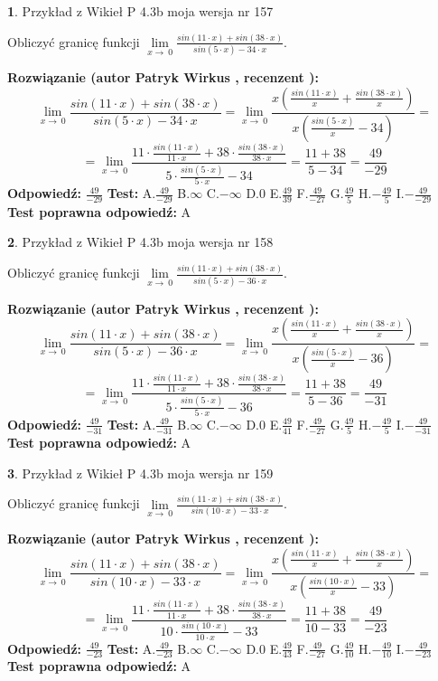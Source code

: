 \documentclass[12pt, a4paper]{article}
\theoremstyle{definition} %
\newtheorem{zad}{}
\newcommand{\zadStart}[1]{\begin{zad}#1\newline}
\newcommand{\zadStop}{\end{zad}}
\newcommand{\rozwStart}[2]{\noindent \textbf{Rozwiązanie (autor #1 , recenzent #2): }\newline}
\newcommand{\rozwStop}{\newline}
\newcommand{\odpStart}{\noindent \textbf{Odpowiedź:}\newline}
\newcommand{\odpStop}{\newline}
\newcommand{\testStart}{\noindent \textbf{Test:}\newline}
\newcommand{\testStop}{\newline}
\newcommand{\kluczStart}{\noindent \textbf{Test poprawna odpowiedź:}\newline}
\newcommand{\kluczStop}{\newline}
\begin{document}
\zadStart{Przykład z Wikieł P 4.3b moja wersja nr 157}


Obliczyć granicę funkcji $\lim\limits_{x\to\ 0}\frac{sin(11 \cdot x)+sin(38 \cdot x)}{sin(5 \cdot x)-34 \cdot x}$.
\zadStop
\rozwStart{Patryk Wirkus}{}
$$\lim\limits_{x\to\ 0}\frac{sin(11 \cdot x)+sin(38 \cdot x)}{sin(5 \cdot x)-34 \cdot x}=\lim\limits_{x\to\ 0}\frac{x(\frac{sin(11 \cdot x)}{x}+\frac{sin(38 \cdot x)}{x})}{x(\frac{sin(5 \cdot x)}{x}-34)}=$$
$$=\lim\limits_{x\to\ 0}\frac{11 \cdot \frac{sin(11 \cdot x)}{11 \cdot x}+38 \cdot \frac{sin(38 \cdot x)}{38 \cdot x}}{5 \cdot \frac{sin(5 \cdot x)}{5 \cdot x}-34}=\frac{11+38}{5-34} = \frac{49}{-29}$$
\rozwStop
\odpStart
$\frac{49}{-29}$
\odpStop
\testStart
A.$\frac{49}{-29}$
B.$\infty$
C.$-\infty$
D.$0$
E.$\frac{49}{39}$
F.$\frac{49}{-27}$
G.$\frac{49}{5}$
H.$-\frac{49}{5}$
I.$-\frac{49}{-29}$
\testStop
\kluczStart
A
\kluczStop



\zadStart{Przykład z Wikieł P 4.3b moja wersja nr 158}


Obliczyć granicę funkcji $\lim\limits_{x\to\ 0}\frac{sin(11 \cdot x)+sin(38 \cdot x)}{sin(5 \cdot x)-36 \cdot x}$.
\zadStop
\rozwStart{Patryk Wirkus}{}
$$\lim\limits_{x\to\ 0}\frac{sin(11 \cdot x)+sin(38 \cdot x)}{sin(5 \cdot x)-36 \cdot x}=\lim\limits_{x\to\ 0}\frac{x(\frac{sin(11 \cdot x)}{x}+\frac{sin(38 \cdot x)}{x})}{x(\frac{sin(5 \cdot x)}{x}-36)}=$$
$$=\lim\limits_{x\to\ 0}\frac{11 \cdot \frac{sin(11 \cdot x)}{11 \cdot x}+38 \cdot \frac{sin(38 \cdot x)}{38 \cdot x}}{5 \cdot \frac{sin(5 \cdot x)}{5 \cdot x}-36}=\frac{11+38}{5-36} = \frac{49}{-31}$$
\rozwStop
\odpStart
$\frac{49}{-31}$
\odpStop
\testStart
A.$\frac{49}{-31}$
B.$\infty$
C.$-\infty$
D.$0$
E.$\frac{49}{41}$
F.$\frac{49}{-27}$
G.$\frac{49}{5}$
H.$-\frac{49}{5}$
I.$-\frac{49}{-31}$
\testStop
\kluczStart
A
\kluczStop



\zadStart{Przykład z Wikieł P 4.3b moja wersja nr 159}


Obliczyć granicę funkcji $\lim\limits_{x\to\ 0}\frac{sin(11 \cdot x)+sin(38 \cdot x)}{sin(10 \cdot x)-33 \cdot x}$.
\zadStop
\rozwStart{Patryk Wirkus}{}
$$\lim\limits_{x\to\ 0}\frac{sin(11 \cdot x)+sin(38 \cdot x)}{sin(10 \cdot x)-33 \cdot x}=\lim\limits_{x\to\ 0}\frac{x(\frac{sin(11 \cdot x)}{x}+\frac{sin(38 \cdot x)}{x})}{x(\frac{sin(10 \cdot x)}{x}-33)}=$$
$$=\lim\limits_{x\to\ 0}\frac{11 \cdot \frac{sin(11 \cdot x)}{11 \cdot x}+38 \cdot \frac{sin(38 \cdot x)}{38 \cdot x}}{10 \cdot \frac{sin(10 \cdot x)}{10 \cdot x}-33}=\frac{11+38}{10-33} = \frac{49}{-23}$$
\rozwStop
\odpStart
$\frac{49}{-23}$
\odpStop
\testStart
A.$\frac{49}{-23}$
B.$\infty$
C.$-\infty$
D.$0$
E.$\frac{49}{43}$
F.$\frac{49}{-27}$
G.$\frac{49}{10}$
H.$-\frac{49}{10}$
I.$-\frac{49}{-23}$
\testStop
\kluczStart
A
\kluczStop
\end{document}
